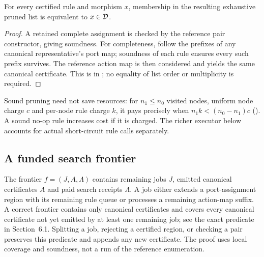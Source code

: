 \begin{theorem}\label{thm:prune}
For every certified rule and morphism $x$, membership in the resulting exhaustive pruned list is equivalent to $x\in\mathcal D$.
\end{theorem}
\begin{proof}
A retained complete assignment is checked by the reference pair constructor, giving soundness. For completeness, follow the prefixes of any canonical representative's port map; soundness of each rule ensures every such prefix survives. The reference action map is then considered and yields the same canonical certificate. This is  in ; no equality of list order or multiplicity is required.
\end{proof}
Sound pruning need not save resources: for $n_1\le n_0$ visited nodes, uniform node charge $c$ and per-node rule charge $k$, it pays precisely when $n_1 k<(n_0-n_1)c$ (). A sound no-op rule increases cost if it is charged. The richer executor below accounts for actual short-circuit rule calls separately.

\subsection{A funded search frontier}
The frontier $f=(J,A,\Lambda)$ contains remaining jobs $J$, emitted canonical certificates $A$ and paid search receipts $\Lambda$. A job either extends a port-assignment region with its remaining rule queue or processes a remaining action-map suffix. A correct frontier contains only canonical certificates and covers every canonical certificate not yet emitted by at least one remaining job; see the exact predicate in Section~6.1. Splitting a job, rejecting a certified region, or checking a pair preserves this predicate and appends any new certificate. The proof uses local coverage and soundness, not a run of the reference enumeration.

